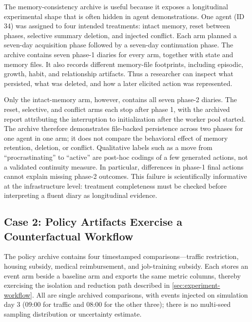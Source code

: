 The memory-consistency archive is useful because it exposes a longitudinal
experimental shape that is often hidden in agent demonstrations.  One agent
(ID 34) was assigned to four intended treatments: intact memory, reset between
phases, selective summary deletion, and injected conflict.  Each arm planned a
seven-day acquisition phase followed by a seven-day continuation phase.  The
archive contains seven phase-1 diaries for every arm, together with state and
memory files.  It also records different memory-file footprints, including
episodic, growth, habit, and relationship artifacts.  Thus a researcher can
inspect what persisted, what was deleted, and how a later elicited action was
represented.

Only the intact-memory arm, however, contains all seven phase-2 diaries.  The
reset, selective, and conflict arms each stop after phase 1, with the archived
report attributing the interruption to initialization after the worker pool
started.  The archive therefore demonstrates file-backed persistence across
two phases for one agent in one arm; it does not compare the behavioral effect
of memory retention, deletion, or conflict.  Qualitative labels such as a move
from ``procrastinating'' to ``active'' are post-hoc codings of a few generated
actions, not a validated continuity measure.  In particular, differences in
phase-1 final actions cannot explain missing phase-2 outcomes.  This failure is
scientifically informative at the infrastructure level: treatment completeness
must be checked before interpreting a fluent diary as longitudinal evidence.

\subsection{Case 2: Policy Artifacts Exercise a Counterfactual Workflow}

The policy archive contains four timestamped comparisons---traffic
restriction, housing subsidy, medical reimbursement, and job-training
subsidy.  Each stores an event arm beside a baseline arm and exports the same
metric columns, thereby exercising the isolation and reduction path described
in \cref{sec:experiment-workflow}.  All are single archived comparisons, with
events injected on simulation day 3 (09:00 for traffic and 08:00 for the other
three); there is no multi-seed sampling distribution or uncertainty estimate.

